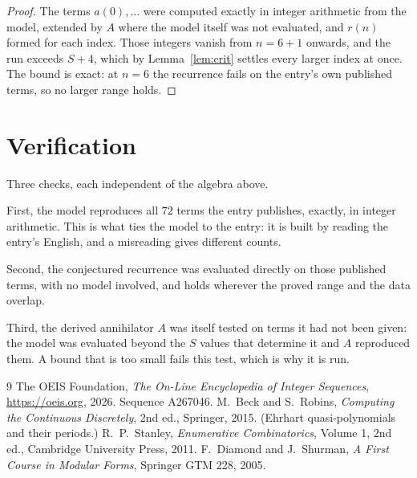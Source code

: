 \documentclass[11pt,a4paper]{article}
\theoremstyle{plain}
\theoremstyle{definition}
\begin{document}
\begin{proof}
The terms $a(0),\dots$ were computed exactly in integer arithmetic from the model, extended by
$A$ where the model itself was not evaluated, and $r(n)$ formed for each index. Those integers
vanish from $n=6+1$ onwards, and the run exceeds $S+4$, which by
Lemma~\ref{lem:crit} settles every larger index at once. The bound is exact: at $n=6$ the recurrence fails on the entry's own published terms, so no larger range holds.
\end{proof}

\section{Verification}

Three checks, each independent of the algebra above.

First, the model reproduces all $72$ terms the entry publishes, exactly, in integer
arithmetic. This is what ties the model to the entry: it is built by reading the entry's
English, and a misreading gives different counts.

Second, the conjectured recurrence was evaluated directly on those published terms, with no
model involved, and holds wherever the proved range and the data overlap.

Third, the derived annihilator $A$ was itself tested on terms it had not been given: the model
was evaluated beyond the $S$ values that determine it and $A$ reproduced them. A bound that is
too small fails this test, which is why it is run.

\begin{thebibliography}{9}
 The OEIS Foundation, \emph{The On-Line Encyclopedia of Integer
Sequences}, \url{https://oeis.org}, 2026. Sequence A267046.
 M.~Beck and S.~Robins, \emph{Computing the Continuous Discretely},
2nd ed., Springer, 2015. (Ehrhart quasi-polynomials and their periods.)
 R.~P.~Stanley, \emph{Enumerative Combinatorics}, Volume 1, 2nd ed.,
Cambridge University Press, 2011.
 F.~Diamond and J.~Shurman, \emph{A First Course in Modular Forms},
Springer GTM 228, 2005.
\end{thebibliography}
\end{document}
